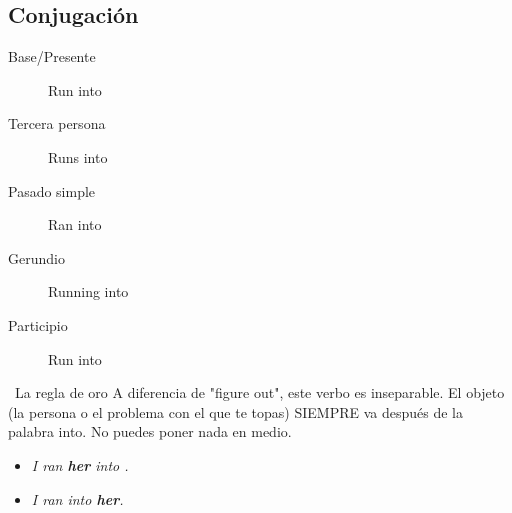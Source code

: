 \documentclass[
10pt, %
a4paper, %
oneside, %
headinclude,footinclude, %
BCOR5mm, %
]{scrartcl}
\begin{document}
\subsection{Conjugación}
\begin{description}
	\item[Base/Presente] Run into
	\item[Tercera persona] Runs into
	\item[Pasado simple] Ran into
	\item[Gerundio] Running into
	\item[Participio] Run into
\end{description}

\begin{InfoBox}{\textcolor{Goldenrod}{} \, La regla de oro} 
	A diferencia de "figure out", este verbo es inseparable. El objeto (la persona o el problema con el que te topas) SIEMPRE va después de la palabra into. No puedes poner nada en medio.
	
	\begin{itemize}
		\item \textcolor{red}{} \textit{I ran \textbf{her} into .}
		\item \textcolor{green}{} \textit{I ran into \textbf{her}.} 
	\end{itemize}
\end{InfoBox}
\end{document}
